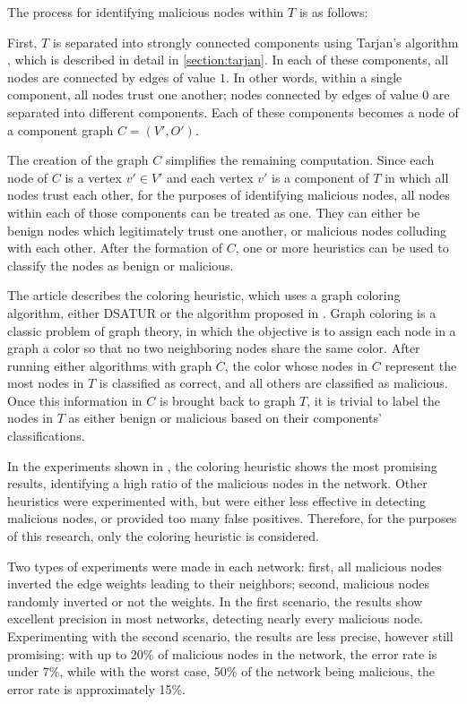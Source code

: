 The process for identifying malicious nodes within $T$ is as follows:

First, $T$ is separated into strongly connected components using Tarjan's algorithm \cite{tarjan1972depth}, which is described in detail in \autoref{section:tarjan}.
In each of these components, all nodes are connected by edges of value $1$.
In other words, within a single component, all nodes trust one another; nodes connected by edges of value $0$ are separated into different components.
Each of these components becomes a node of a component graph $C = (V', O')$.

The creation of the graph $C$ simplifies the remaining computation.
Since each node of $C$ is a vertex $v' \in V'$ and each vertex $v'$ is a component of $T$ in which all nodes trust each other, for the purposes of identifying malicious nodes, all nodes within each of those components can be treated as one.
They can either be benign nodes which legitimately trust one another, or malicious nodes colluding with each other.
After the formation of $C$, one or more heuristics can be used to classify the nodes as benign or malicious.

The article describes the coloring heuristic, which uses a graph coloring algorithm, either DSATUR \cite{brelaz1979new} or the algorithm proposed in \cite{mittal2011graph}.
Graph coloring is a classic problem of graph theory, in which the objective is to assign each node in a graph a color so that no two neighboring nodes share the same color.
After running either algorithms with graph $C$, the color whose nodes in $C$ represent the most nodes in $T$ is classified as correct, and all others are classified as malicious.
Once this information in $C$ is brought back to graph $T$, it is trivial to label the nodes in $T$ as either benign or malicious based on their components' classifications.

In the experiments shown in \cite{vernize2013dissertation}, the coloring heuristic shows the most promising results, identifying a high ratio of the malicious nodes in the network.
Other heuristics were experimented with, but were either less effective in detecting malicious nodes, or provided too many false positives.
Therefore, for the purposes of this research, only the coloring heuristic is considered.

Two types of experiments were made in each network: first, all malicious nodes inverted the edge weights leading to their neighbors; second, malicious nodes randomly inverted or not the weights.
In the first scenario, the results show excellent precision in most networks, detecting nearly every malicious node.
Experimenting with the second scenario, the results are less precise, however still promising: with up to 20\% of malicious nodes in the network, the error rate is under 7\%, while with the worst case, 50\% of the network being malicious, the error rate is approximately 15\%.

